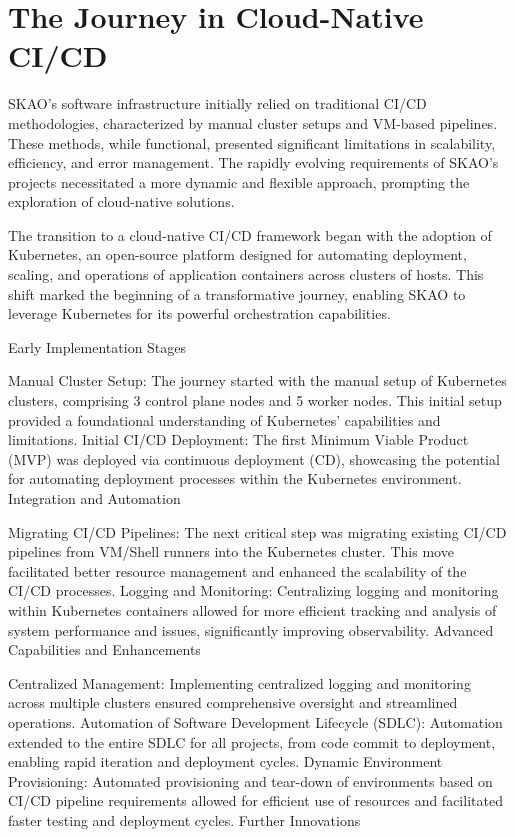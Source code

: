\documentclass[a4paper]{spie}  %
\begin{document}
\section{The Journey in Cloud-Native CI/CD}

SKAO's software infrastructure initially relied on traditional CI/CD methodologies, characterized by manual cluster setups and VM-based pipelines. These methods, while functional, presented significant limitations in scalability, efficiency, and error management. The rapidly evolving requirements of SKAO's projects necessitated a more dynamic and flexible approach, prompting the exploration of cloud-native solutions.

The transition to a cloud-native CI/CD framework began with the adoption of Kubernetes, an open-source platform designed for automating deployment, scaling, and operations of application containers across clusters of hosts. This shift marked the beginning of a transformative journey, enabling SKAO to leverage Kubernetes for its powerful orchestration capabilities.

Early Implementation Stages

Manual Cluster Setup: The journey started with the manual setup of Kubernetes clusters, comprising 3 control plane nodes and 5 worker nodes. This initial setup provided a foundational understanding of Kubernetes' capabilities and limitations.
Initial CI/CD Deployment: The first Minimum Viable Product (MVP) was deployed via continuous deployment (CD), showcasing the potential for automating deployment processes within the Kubernetes environment.
Integration and Automation

Migrating CI/CD Pipelines: The next critical step was migrating existing CI/CD pipelines from VM/Shell runners into the Kubernetes cluster. This move facilitated better resource management and enhanced the scalability of the CI/CD processes.
Logging and Monitoring: Centralizing logging and monitoring within Kubernetes containers allowed for more efficient tracking and analysis of system performance and issues, significantly improving observability.
Advanced Capabilities and Enhancements

Centralized Management: Implementing centralized logging and monitoring across multiple clusters ensured comprehensive oversight and streamlined operations.
Automation of Software Development Lifecycle (SDLC): Automation extended to the entire SDLC for all projects, from code commit to deployment, enabling rapid iteration and deployment cycles.
Dynamic Environment Provisioning: Automated provisioning and tear-down of environments based on CI/CD pipeline requirements allowed for efficient use of resources and facilitated faster testing and deployment cycles.
Further Innovations
\end{document}
